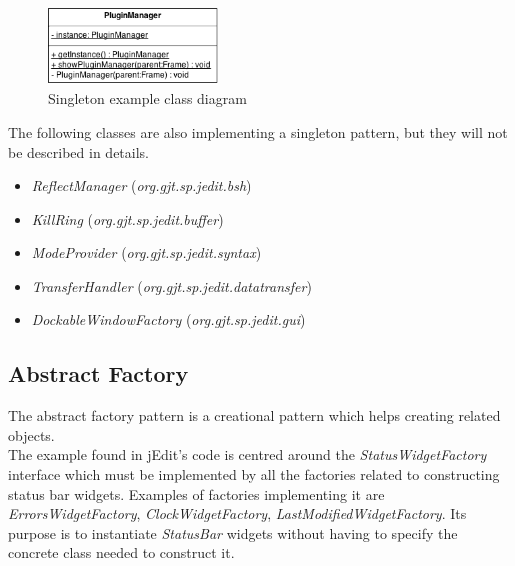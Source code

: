 \begin{figure}[h!]
    \includegraphics[width=0.4\textwidth]{images/singleton.png}
    \centering
    \caption{Singleton example class diagram}
\end{figure}

\begin{framehint}
    The following classes are also implementing a singleton pattern, but they
    will not be described in details.

    \begin{itemize}\itemsep1pt
        \item \emph{ReflectManager} (\emph{org.gjt.sp.jedit.bsh})
        \item \emph{KillRing} (\emph{org.gjt.sp.jedit.buffer})
        \item \emph{ModeProvider} (\emph{org.gjt.sp.jedit.syntax})
        \item \emph{TransferHandler} (\emph{org.gjt.sp.jedit.datatransfer})
        \item \emph{DockableWindowFactory} (\emph{org.gjt.sp.jedit.gui})
    \end{itemize}
\end{framehint}
\newpage

\subsection{Abstract Factory}
\noindent The abstract factory pattern is a creational pattern which helps creating
related objects.\\

The example found in jEdit's code is centred around the
\emph{StatusWidgetFactory} interface which must be implemented by all the
factories related to constructing status bar widgets. Examples of factories
implementing it are \emph{ErrorsWidgetFactory}, \emph{ClockWidgetFactory},
\emph{LastModifiedWidgetFactory}. Its purpose is to instantiate \emph{StatusBar}
widgets without having to specify the concrete class needed to construct it.

